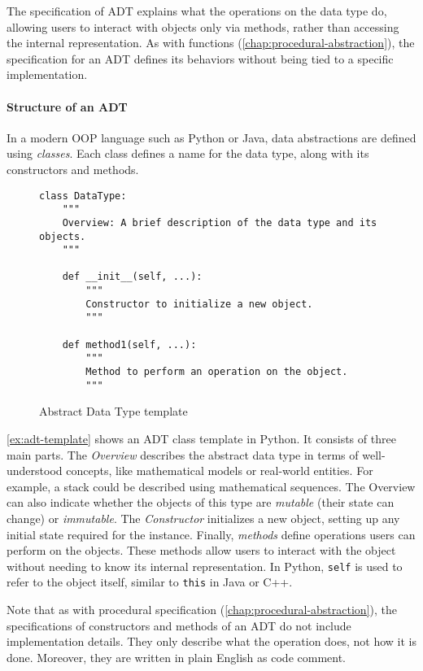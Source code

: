 \documentclass[oneside,11pt,dvipsnames]{book}
\newcommand{\code}[1]{\texttt{#1}}
\begin{document}
The specification of ADT explains what the operations on the data type do, allowing users to interact with objects only via methods, rather than accessing the internal representation. 
As with functions (\autoref{chap:procedural-abstraction}), the specification for an ADT defines its behaviors without being tied to a specific implementation.


\paragraph{Structure of an ADT} In a modern OOP language such as Python or Java, data abstractions are defined using \emph{classes}. Each class defines a name for the data type, along with its constructors and methods.

\begin{figure}
    \begin{lstlisting}
class DataType:
    """
    Overview: A brief description of the data type and its objects.
    """

    def __init__(self, ...):
        """
        Constructor to initialize a new object.
        """

    def method1(self, ...):
        """
        Method to perform an operation on the object.
        """
    \end{lstlisting}
    \caption{Abstract Data Type template}\label{ex:adt-template}
\end{figure}


\autoref{ex:adt-template} shows an ADT class template in Python. It consists of three main parts. The \emph{Overview} describes the abstract data type in terms of well-understood concepts, like mathematical models or real-world entities. For example, a stack could be described using mathematical sequences.
The Overview can also indicate whether the objects of this type are \emph{mutable} (their state can change) or \emph{immutable}.
The \emph{Constructor} initializes a new object, setting up any initial state required for the instance.
Finally, \emph{methods} define operations users can perform on the objects. These methods allow users to interact with the object without needing to know its internal representation. In Python, \code{self} is used to refer to the object itself, similar to \code{this} in Java or C++.

Note that as with procedural specification (\autoref{chap:procedural-abstraction}), the specifications of constructors and methods of an ADT do not include implementation details. They only describe what the operation does, not how it is done. Moreover, they are written in plain English as code comment.
\end{document}
